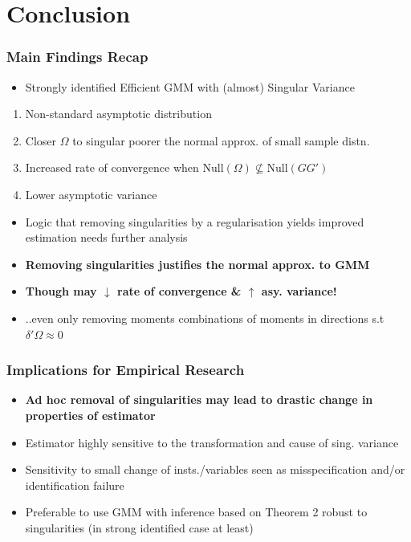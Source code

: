 \documentclass{beamer}
\begin{document}
\section{Conclusion}

\begin{frame}
\frametitle{Main Findings Recap}
\begin{itemize}
\item[] Strongly identified Efficient GMM with (almost) Singular Variance
\end{itemize}
\begin{enumerate}
 \item Non-standard asymptotic distribution
 \item Closer $\Omega$ to singular poorer the normal approx. of small sample distn.
 \item Increased rate of convergence when $\textrm{Null}(\Omega) \nsubseteq \textrm{Null}(GG')$
 \item Lower asymptotic variance
 \end{enumerate}
 \begin{itemize}
 \pause
 \item Logic that removing singularities by a regularisation yields improved estimation needs further analysis

 \item[]\textbf{Removing singularities justifies the  normal approx. to GMM}

 \item[] \textbf{Though may $\downarrow$ rate of  convergence \& $\uparrow$ asy. variance!}
 \vspace{5pt}
 \item[] ..even  only removing moments combinations of moments in directions s.t $\delta'\Omega\approx 0$

\end{itemize}

\end{frame}



 \begin{frame}
\frametitle{Implications for Empirical Research}
\begin{itemize}

\item[] \textbf{Ad hoc removal of singularities may lead to drastic change in properties of estimator}
\vspace{10pt}
\item[] Estimator highly sensitive to the transformation and  cause of sing. variance
\vspace{10pt}
\item[]  Sensitivity to small change of insts./variables seen as misspecification and/or identification failure

\vspace{10pt}
\item[] Preferable to use GMM with inference based on Theorem 2 robust to singularities (in strong identified case at least)

\end{itemize}
\end{frame}
\end{document}
